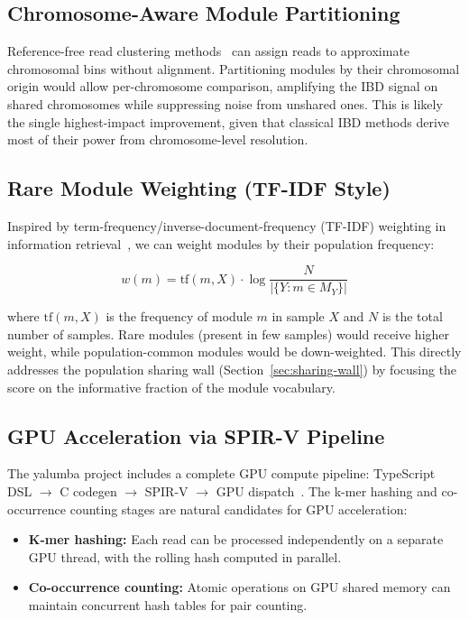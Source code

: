 \documentclass{../yalumba}
\begin{document}
\subsection{Chromosome-Aware Module Partitioning}

Reference-free read clustering methods~\cite{ebert2021haplotype} can
assign reads to approximate chromosomal bins without alignment.  Partitioning
modules by their chromosomal origin would allow per-chromosome comparison,
amplifying the IBD signal on shared chromosomes while suppressing noise
from unshared ones.  This is likely the single highest-impact improvement,
given that classical IBD methods derive most of their power from
chromosome-level resolution.

\subsection{Rare Module Weighting (TF-IDF Style)}

Inspired by term-frequency/inverse-document-frequency (TF-IDF) weighting
in information retrieval~\cite{salton1988tfidf}, we can weight modules by
their population frequency:

\begin{equation}
  w(m) = \text{tf}(m, X) \cdot \log\frac{N}{|\{Y : m \in M_Y\}|}
  \label{eq:tfidf}
\end{equation}

\noindent where $\text{tf}(m, X)$ is the frequency of module $m$ in sample
$X$ and $N$ is the total number of samples.  Rare modules (present in few
samples) would receive higher weight, while population-common modules would
be down-weighted.  This directly addresses the population sharing wall
(Section~\ref{sec:sharing-wall}) by focusing the score on the informative
fraction of the module vocabulary.

\subsection{GPU Acceleration via SPIR-V Pipeline}

The yalumba project includes a complete GPU compute pipeline: TypeScript
DSL $\to$ C codegen $\to$ SPIR-V $\to$ GPU dispatch~\cite{liao2025sv}.
The k-mer hashing and co-occurrence counting stages are natural candidates
for GPU acceleration:

\begin{itemize}
  \item \textbf{K-mer hashing:}  Each read can be processed independently
        on a separate GPU thread, with the rolling hash computed in parallel.
  \item \textbf{Co-occurrence counting:}  Atomic operations on GPU shared
        memory can maintain concurrent hash tables for pair counting.
\end{itemize}
\end{document}

